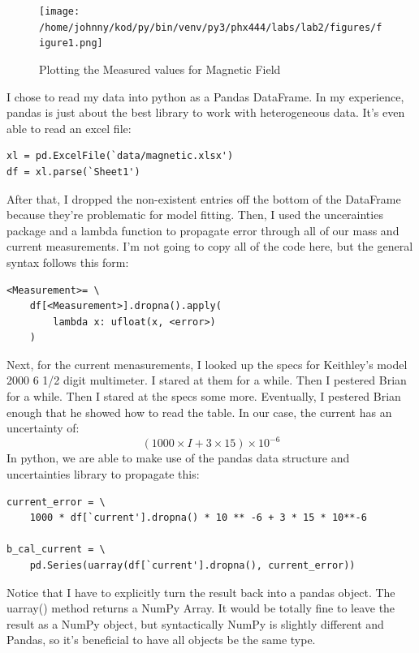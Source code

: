 \documentclass{article}
\begin{document}
\begin{figure}[H]
        \begin{center}
        \texttt{[image: /home/johnny/kod/py/bin/venv/py3/phx444/labs/lab2/figures/figure1.png]}
        \caption{Plotting the Measured values for Magnetic Field}
        \label{fig:fig_1}
        \end{center}
\end{figure}
I chose to read my data into python as a Pandas DataFrame. In my experience,
pandas is just about the best library to work with heterogeneous data. It's
even able to read an excel file:
\begin{center}
\begin{minipage}[t]{.75\textwidth}
\begin{lstlisting}[frame=tlrb]
xl = pd.ExcelFile(`data/magnetic.xlsx')
df = xl.parse(`Sheet1')
\end{lstlisting}
\end{minipage}
\end{center}
After that, I dropped the non-existent entries off the bottom of the DataFrame
because they're problematic for model fitting. Then, I used the uncerainties
package and a lambda function to propagate error through all of our mass and 
current measurements. I'm not going to copy all of the code here, but the
general syntax follows this form:
\begin{center}
\begin{minipage}[t]{.75\textwidth}
\begin{lstlisting}[frame=tlrb]
<Measurement>= \
    df[<Measurement>].dropna().apply(
        lambda x: ufloat(x, <error>)
    )
\end{lstlisting}
\end{minipage}
\end{center}
Next, for the current menasurements, I looked up the specs for
Keithley's model 2000 6 1/2 digit multimeter. I stared at them for a while.
Then I pestered Brian for a while. Then I stared at the specs some more. Eventually, I
pestered Brian enough that he showed how to read the table. In our case, the current 
has an uncertainty of:
$$(1000 \times I + 3 \times 15) \times 10^{-6}$$
In python, we are able to make use of the pandas data structure and
uncertainties library to propagate this:
\begin{verbatim}
current_error = \
    1000 * df[`current'].dropna() * 10 ** -6 + 3 * 15 * 10**-6

b_cal_current = \
    pd.Series(uarray(df[`current'].dropna(), current_error))
\end{verbatim}
Notice that I have to explicitly turn the result back into a
pandas object. The uarray() method returns a NumPy Array. It would be totally
fine to leave the result as a NumPy object, but syntactically NumPy is slightly
different and Pandas, so it's beneficial to have all objects be the same type.
\end{document}
